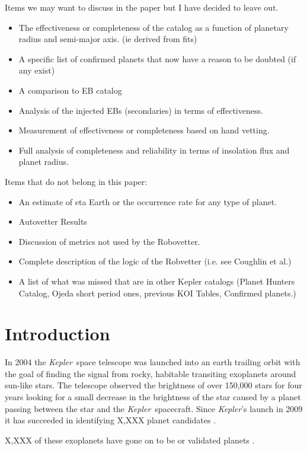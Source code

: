 \documentclass[onecolumn]{aastex6}
\newcommand\Kepler{\textit{Kepler}}
\begin{document}
Items we may want to discuss in the paper but I have decided to leave out.
\begin{itemize}
\item The effectiveness or completeness of the catalog as a function of planetary radius and semi-major axis. (ie derived from fits) 
\item A specific list of confirmed planets that now have a reason to be doubted (if any exist)
\item A comparison to EB catalog
\item Analysis of the injected EBs (secondaries) in terms of effectiveness.
\item Measurement of effectiveness or completeness based on hand vetting.
\item Full analysis of completeness and reliability in terms of insolation flux and planet radius. 
\end{itemize}

Items that do not belong in this paper:
\begin{itemize}
\item An estimate of eta Earth or the occurrence rate for any type of planet.
\item Autovetter Results
\item Discussion of metrics not used by the Robovetter.
\item Complete description of the logic of the Robvetter (i.e. see Coughlin et al.)
\item A list of what was missed that are in other Kepler catalogs (Planet Hunters Catalog, Ojeda short period ones, previous KOI Tables, Confirmed planets.)
\end{itemize}

\section{Introduction}

In 2004 the \Kepler\ space telescope was launched into an earth trailing orbit with the goal of finding the signal from rocky, habitable transiting exoplanets \citep{Koch2010} around sun-like stars. The telescope observed the brightness of over 150,000 stars for four years looking for a small decrease in the brightness of the star caused by a planet passing between the star and the \Kepler\ spacecraft. 
Since \Kepler's launch in 2009 it has succeeded in identifying X,XXX planet candidates \citep{Borucki2010,Coughlin20016}. 

X,XXX of these exoplanets have gone on to be   \citep[e.g.][]{FOP?} or validated planets \citep[see most recently][]{Morton2016}. 
\end{document}
